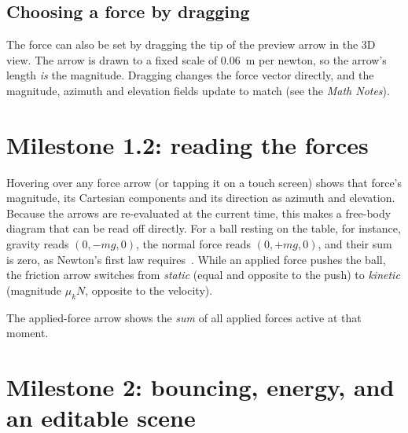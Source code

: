 \documentclass[11pt]{article}
\begin{document}
\subsection{Choosing a force by dragging}
The force can also be set by dragging the tip of the preview arrow in the 3D view. The arrow is
drawn to a fixed scale of \SI{0.06}{m} per newton, so the arrow's length \emph{is} the
magnitude. Dragging changes the force vector directly, and the magnitude, azimuth and
elevation fields update to match (see the \emph{Math Notes}).

\section{Milestone 1.2: reading the forces}
Hovering over any force arrow (or tapping it on a touch screen) shows that force's magnitude,
its Cartesian components and its direction as azimuth and elevation. Because the arrows are
re-evaluated at the current time, this makes a free-body diagram that can be read off directly.
For a ball resting on the table, for instance, gravity reads $(0, -mg, 0)$, the normal force reads
$(0, +mg, 0)$, and their sum is zero, as Newton's first law requires~\cite{halliday2013}. While an
applied force pushes the ball, the friction arrow switches from \emph{static} (equal and opposite to
the push) to \emph{kinetic} (magnitude $\mu_k N$, opposite to the velocity).

The applied-force arrow shows the \emph{sum} of all applied forces active at that moment.

\section{Milestone 2: bouncing, energy, and an editable scene}
\end{document}
